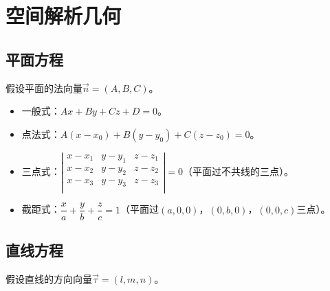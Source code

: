 \documentclass[UTF8, 12pt]{ctexart}
\begin{document}
        \section{空间解析几何}

        \subsection{平面方程}

        假设平面的法向量$\vec{n}=(A,B,C)$。

        \begin{itemize}
            \item 一般式：$Ax+By+Cz+D=0$。
            \item 点法式：$A(x-x_0)+B(y-y_0)+C(z-z_0)=0$。
            \item 三点式：$\left\vert\begin{array}{ccc}
                                        x-x_1 & y-y_1 & z-z_1 \\
                                        x-x_2 & y-y_2 & z-z_2 \\
                                        x-x_3 & y-y_3 & z-z_3 \\
            \end{array}\right\vert=0$（平面过不共线的三点）。
            \item 截距式：$\dfrac{x}{a}+\dfrac{y}{b}+\dfrac{z}{c}=1$（平面过$(a,0,0)$，$(0,b,0)$，$(0,0,c)$三点）。
        \end{itemize}

        \subsection{直线方程}

        假设直线的方向向量$\vec{\tau}=(l,m,n)$。
\end{document}
